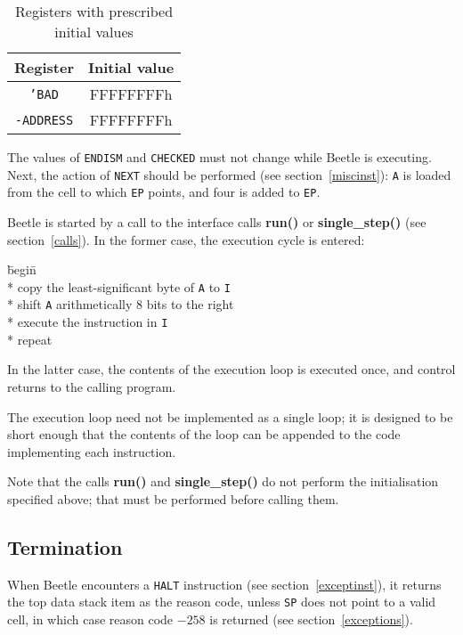 \documentclass[english]{article}
\begin{document}
\begin{table}[htbp]
\begin{center}
\begin{tabular}{cc} \toprule
\bf Register & \bf Initial value \\ \midrule
{\tt 'BAD} & {FFFFFFFFh} \\
{\tt -ADDRESS} & {FFFFFFFFh} \\ \bottomrule
\end{tabular}
\caption{\label{inittable}Registers with prescribed initial values}
\end{center}
\end{table}

The values of {\tt ENDISM} and
{\tt CHECKED} must not change while Beetle is executing. Next, the action of
{\tt NEXT} should be performed (see section~\ref{miscinst}): {\tt A} is loaded
from the cell to which {\tt EP} points, and four is added to {\tt EP}.

Beetle is started by a call to the interface calls {\bf run()} or {\bf
single\_step()} (see section~\ref{calls}). In the former case, the execution
cycle is entered:

\begin{tabbing}
\hspace{0.5in}\=begin\=\+\+ \\*
copy the least-significant byte of {\tt A} to {\tt I} \\*
shift {\tt A} arithmetically 8 bits to the right \\*
execute the instruction in {\tt I} \- \\*
repeat
\end{tabbing}

In the latter case, the contents of the execution loop is executed once, and
control returns to the calling program.

The execution loop need not be implemented as a single loop; it  is designed to
be short enough that the contents of the loop can be appended  to the code
implementing each instruction.

Note that the calls {\bf run()} and {\bf single\_step()} do not perform the
initialisation specified above; that must be performed before calling them.


\subsection{Termination}

When Beetle encounters a {\tt HALT} instruction (see section~\ref{exceptinst}),
it returns the top data stack item as the reason code, unless {\tt SP} does not
point to a valid cell, in which case reason code $-258$ is returned (see section~\ref{exceptions}).
\end{document}
